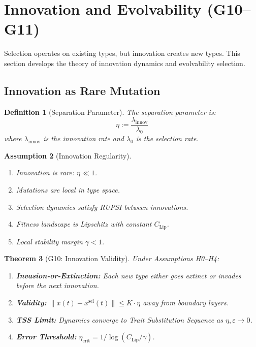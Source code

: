\documentclass[12pt]{article}
\newtheorem{theorem}{Theorem}[section]
\newtheorem{definition}[theorem]{Definition}
\newtheorem{assumption}[theorem]{Assumption}
\begin{document}

\section{Innovation and Evolvability (G10--G11)}
\label{sec:g10-g11}

Selection operates on existing types, but innovation creates new types. This section develops the theory of innovation dynamics and evolvability selection.

\subsection{Innovation as Rare Mutation}

\begin{definition}[Separation Parameter]
The \emph{separation parameter} is:
\[
\eta := \frac{\lambda_{\mathrm{innov}}}{\lambda_0}
\]
where $\lambda_{\mathrm{innov}}$ is the innovation rate and $\lambda_0$ is the selection rate.
\end{definition}

\begin{assumption}[Innovation Regularity]
\label{ass:innovation}
\begin{enumerate}
    \item[\textbf{(H0)}] Innovation is rare: $\eta \ll 1$.
    \item[\textbf{(H1)}] Mutations are local in type space.
    \item[\textbf{(H2)}] Selection dynamics satisfy RUPSI between innovations.
    \item[\textbf{(H3)}] Fitness landscape is Lipschitz with constant $C_{\mathrm{Lip}}$.
    \item[\textbf{(H4)}] Local stability margin $\gamma < 1$.
\end{enumerate}
\end{assumption}

\begin{theorem}[G10: Innovation Validity]
\label{thm:g10}
Under Assumptions H0--H4:
\begin{enumerate}
    \item[(a)] \textbf{Invasion-or-Extinction:} Each new type either goes extinct or invades before the next innovation.
    \item[(b)] \textbf{Validity:} $\|x(t) - x^{\mathrm{sel}}(t)\| \leq K \cdot \eta$ away from boundary layers.
    \item[(c)] \textbf{TSS Limit:} Dynamics converge to Trait Substitution Sequence as $\eta, \varepsilon \to 0$.
    \item[(d)] \textbf{Error Threshold:} $\eta_{\mathrm{crit}} = 1 / \log(C_{\mathrm{Lip}} / \gamma)$.
\end{enumerate}
\end{theorem}
\end{document}
